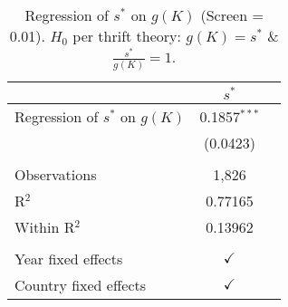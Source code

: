 \begin{table}[pos=h]
\caption{Regression of \(s^*\) on \(g(K)\) (Screen = 0.01). \(H_0\) per thrift theory: \(g(K) = s^*\) \& \(\frac{s^*}{g(K)} = 1\).}
\centering
\begin{tabularx}{\columnwidth}{lcc}
   \toprule
                                     & $s^*$ \\   
   \midrule 
   Regression of $s^*$ on \(g(K)\)   & 0.1857$^{***}$\\   
                                     & (0.0423)\\   
    \\
   Observations                      & 1,826\\  
   R$^2$                             & 0.77165\\  
   Within R$^2$                      & 0.13962\\  
    \\
   Year fixed effects                & $\checkmark$\\   
   Country fixed effects             & $\checkmark$\\   
   \bottomrule
\end{tabularx}
   \label{tbl-4}
\end{table}